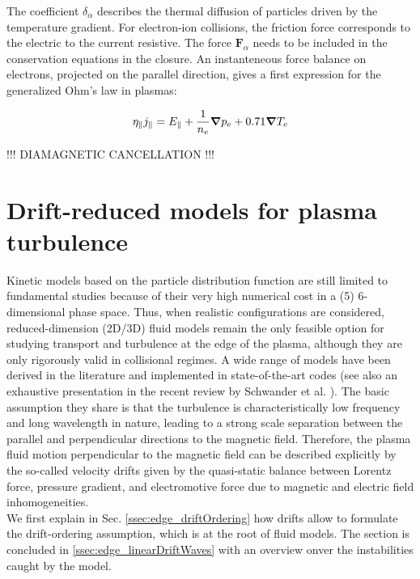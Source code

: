The coefficient $\delta_\alpha$ describes the thermal diffusion of particles driven by the temperature gradient. For electron-ion collisions, the friction force corresponds to the electric to the current resistive. The force $\textbf{F}_\alpha$ needs to be included in the conservation equations in the closure. An instanteneous force balance on electrons, projected on the parallel direction, gives a first expression for the generalized Ohm's law in plasmas:

\begin{equation}
	\eta_\parallel j_\parallel = E_\parallel + \frac{1}{n_e}\grad p_e + 0.71\grad{T_e}
\end{equation}

!!!  DIAMAGNETIC CANCELLATION !!!



\section{Drift-reduced models for plasma turbulence}
\label{sec:edge_driftWaves}


Kinetic models based on the particle distribution function \cite{DifPradalier_2009, Charidakos_2018} are still limited to fundamental studies because of their very high numerical cost in a (5) 6-dimensional phase space. Thus, when realistic configurations are considered, reduced-dimension (2D/3D) fluid models remain the only feasible option for studying transport and turbulence at the edge of the plasma, although they are only rigorously valid in collisional regimes. A wide range of models have been derived in the literature and implemented in state-of-the-art codes \cite{DUDSON_2009, giacomin2022gbs, stegmeir2019} (see also an exhaustive presentation in the recent review by Schwander et al. \cite{SCHWANDER_2024}). The basic assumption they share is that the turbulence is characteristically low frequency and long wavelength in nature, leading to a strong scale separation between the parallel and perpendicular directions to the magnetic field. Therefore, the plasma fluid motion perpendicular to the magnetic field can be described explicitly by the so-called velocity drifts given by the quasi-static balance between Lorentz force, pressure gradient, and electromotive force due to magnetic and electric field inhomogeneities. \\

We first explain in Sec. \ref{ssec:edge_driftOrdering} how drifts allow to formulate the drift-ordering assumption, which is at the root of fluid models. The section is concluded in \ref{ssec:edge_linearDriftWaves} with an overview onver the instabilities caught by the model. 


